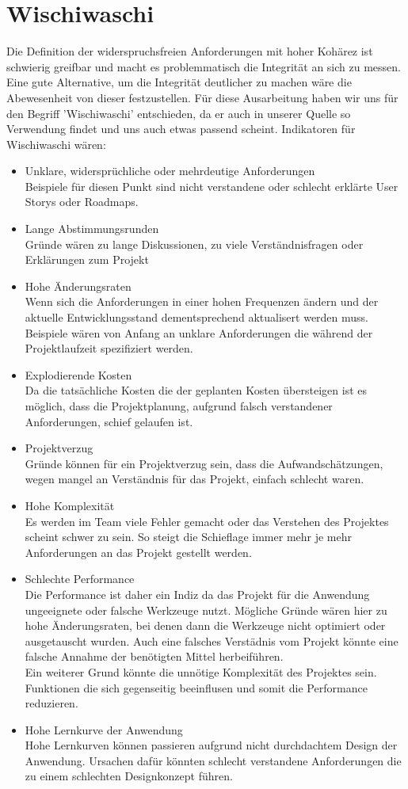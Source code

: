 \documentclass[a4paper, ngerman, 12pt, usenames, dvipsnames]{article}
\begin{document}
\section{Wischiwaschi}
Die Definition der widerspruchsfreien Anforderungen mit hoher Kohärez ist schwierig greifbar und macht es problemmatisch die Integrität an sich zu messen.
Eine gute Alternative, um die Integrität deutlicher zu machen wäre die Abewesenheit von dieser festzustellen. Für diese Ausarbeitung haben wir uns für den Begriff 'Wischiwaschi' entschieden, da er auch in unserer Quelle so Verwendung findet und uns auch etwas passend scheint. Indikatoren für Wischiwaschi wären: \\
\begin{itemize}
    \item Unklare, widersprüchliche oder mehrdeutige Anforderungen\\
Beispiele für diesen Punkt sind nicht verstandene oder schlecht erklärte User Storys oder Roadmaps. 
    \item Lange Abstimmungsrunden\\
Gründe wären zu lange Diskussionen, zu viele Verständnisfragen oder Erklärungen zum Projekt
    \item Hohe Änderungsraten\\
Wenn sich die Anforderungen in einer hohen Frequenzen ändern und der aktuelle Entwicklungsstand dementsprechend aktualisert werden muss. Beispiele wären von Anfang an unklare Anforderungen die während der Projektlaufzeit spezifiziert werden.
    \item Explodierende Kosten\\
Da die tatsächliche Kosten die der geplanten Kosten übersteigen ist es möglich, dass die Projektplanung, aufgrund falsch verstandener Anforderungen, schief gelaufen ist.
    \item Projektverzug\\
Gründe können für ein Projektverzug sein, dass die Aufwandschätzungen, wegen mangel an Verständnis für das Projekt, einfach schlecht waren.
    \item Hohe Komplexität\\
Es werden im Team viele Fehler gemacht oder das Verstehen des Projektes scheint schwer zu sein. So steigt die Schieflage immer mehr je mehr Anforderungen an das Projekt gestellt werden.
    \item Schlechte Performance\\
Die Performance ist daher ein Indiz da das Projekt für die Anwendung ungeeignete oder falsche Werkzeuge nutzt. Mögliche Gründe wären hier zu hohe Änderungsraten, bei denen dann die Werkzeuge nicht optimiert oder ausgetauscht wurden. Auch eine falsches Verstädnis vom Projekt könnte eine falsche Annahme der benötigten Mittel herbeiführen.\\
Ein weiterer Grund könnte die unnötige Komplexität des Projektes sein. Funktionen die sich gegenseitig beeinflusen und somit die Performance reduzieren.
    \item Hohe Lernkurve der Anwendung\\
Hohe Lernkurven können passieren aufgrund nicht durchdachtem Design der Anwendung. Ursachen dafür könnten schlecht verstandene Anforderungen die zu einem schlechten Designkonzept führen.
\end{itemize}
\end{document}
